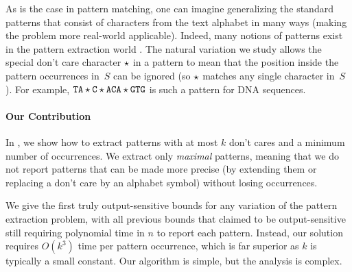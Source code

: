As is the case in pattern matching, one can imagine generalizing the standard patterns that consist of characters from the text alphabet in many ways (making the problem more real-world applicable). Indeed, many notions of patterns exist in the pattern extraction world
\cite{CominV13, CunialA12, ApostolicoPU11, rime, Eskin04, IliopoulosMPPRS05, grossi2011madmx, IsaacAU05, sagot1998spelling, tcsUkkonen09, arimura2007efficient}. The natural variation we study allows the special don't care character $\star$ in a pattern to mean that the position inside the pattern occurrences in~$S$ can be ignored (so $\star$ matches any single character in~$S$). For example, $\mathtt{TA}\star\mathtt{C}\star \mathtt{ACA}\star \mathtt{GTG}$ is such a pattern for DNA sequences.


\paragraph{Our Contribution} 
In , we show how to extract patterns with at most $k$ don't cares and a minimum number of occurrences. We extract only \emph{maximal} patterns, meaning that we do not report patterns that can be made more precise (by extending them or replacing a don't care by an alphabet symbol) without losing occurrences.

We give the first truly output-sensitive bounds for any variation of the pattern extraction problem, with all previous bounds that claimed to be output-sensitive still requiring polynomial time in $n$ to report each pattern. Instead, our solution requires $O(k^3)$ time per pattern occurrence, which is far superior as $k$ is typically a small constant. Our algorithm is simple, but the analysis is complex.

